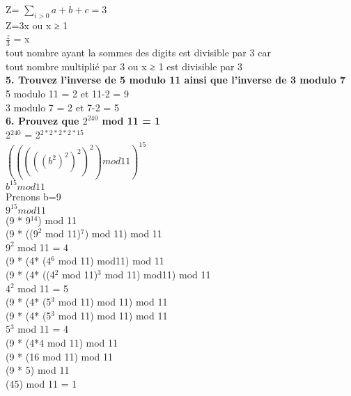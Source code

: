 Z= $\sum_{i>0} a+b+c=3 $ \\
Z=3x ou x ≥ 1 \\
$\frac{z}{3}$ = x \\

tout nombre ayant la sommes des digits est divisible par 3 car \\
tout nombre multiplié par 3 ou x ≥ 1 est divisible par 3 \\


\textbf{5. Trouvez l’inverse de 5 modulo 11 ainsi que l’inverse de 3 modulo 7} \\

5 modulo 11 = 2 et 11-2 = 9 \\

3 modulo 7 = 2 et 7-2 = 5 \\

\newpage
\textbf{6. Prouvez que $2^{240}$ mod 11 = 1} \\

2$^{240}$ = 2$^{2*2*2*2*15}$ \\

$(((((b^{2})^{2})^{2})^{2}) mod 11)^{15}$ \\

$b^{15} mod 11$ \\

Prenons b=9 \\

$9^{15} mod 11$ \\

(9 * 9$^{14}$) mod 11 \\

(9 * (($9^{2}$ mod 11)$^{7}$) mod 11) mod 11 \\

$9^{2}$ mod 11 = 4 \\

(9 * (4* (4$^{6}$ mod 11) mod11) mod 11 \\

(9 * (4* ((4$^{2}$ mod 11)$^{3}$ mod 11) mod11) mod 11 \\

4$^{2}$ mod 11 = 5 \\

(9 * (4* (5$^{3}$ mod 11) mod 11) mod 11 \\

(9 * (4* (5$^{3}$ mod 11) mod 11) mod 11 \\

5$^{3}$ mod 11 = 4 \\

(9 * (4*4 mod 11) mod 11 \\

(9 * (16 mod 11) mod 11 \\

(9 * 5) mod 11 \\

(45) mod 11 = 1 \\
